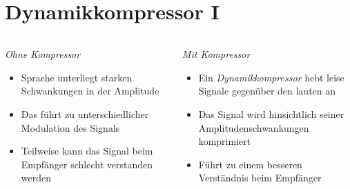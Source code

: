 
\section{Dynamikkompressor I}
\label{section:dynamik_kompressor_1}
\begin{frame}%

\begin{columns}
    \begin{column}{0.48\textwidth}
    \emph{Ohne Kompressor}

\begin{itemize}
  \item Sprache unterliegt starken Schwankungen in der Amplitude
  \item Das führt zu unterschiedlicher Modulation des Signals
  \item Teilweise kann das Signal beim Empfänger schlecht verstanden werden
  \end{itemize}

    \end{column}
   \begin{column}{0.48\textwidth}
       \emph{Mit Kompressor}

\begin{itemize}
  \item Ein \emph{Dynamikkompressor} hebt leise Signale gegenüber den lauten an
  \item Das Signal wird hinsichtlich seiner Amplitudenschwankungen komprimiert
  \item Führt zu einem besseren Verständnis beim Empfänger
  \end{itemize}

   \end{column}
\end{columns}

\end{frame}

\begin{frame}
\end{frame}%
